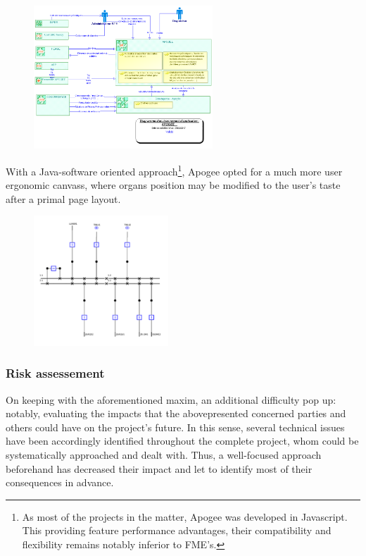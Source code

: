 \begin{figure}[h]
    \centering
    \parbox[t]{0.6\textwidth}{
    \href{http://collab.rte-france.com/SITES/cca/ref_architecture/AtRte/Pages/Accueil.aspx}{\includegraphics[width=0.6\textwidth]{0.figuras/diagram_APOGEE.png}}
    }
    \label{fig:APOGEE_diag}
\end{figure}

With a Java-software oriented approach\footnote{As most of the projects in the matter, Apogee was developed in Javascript. This providing feature performance advantages, their compatibility and flexibility remains notably inferior to FME's.}, Apogee opted for a much more user ergonomic canvass, where organs position may be modified to the user's taste after a primal page layout.

\begin{figure}[h]
    \centering
    \parbox[t]{0.45\textwidth}{
    \href{}{\includegraphics[width=0.45\textwidth]{0.figuras/TFM-Apogee-GAI.png}}
    }
    \label{fig:TFM-Apogee-GAI}
\end{figure}

\subsubsection{Risk assessement}
\label{subsub:introduction:thesis-purpose:risk-assessement}
On keeping with the aforementioned maxim, an additional difficulty pop up: notably, evaluating the impacts that the abovepresented concerned parties and others could have on the project's future. In this sense, several technical issues have been accordingly identified throughout the complete project, whom could be systematically approached and dealt with. Thus, a well-focused approach beforehand has decreased their impact and let to identify most of their consequences in advance.

